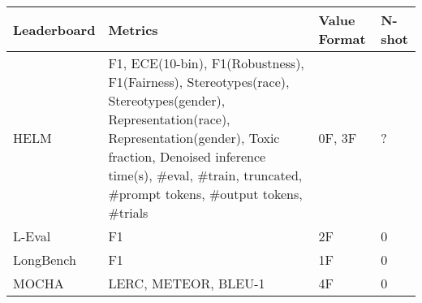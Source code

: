 \begin{tabular}{llll}
\toprule
Leaderboard & Metrics & Value Format & N-shot \\
\midrule
HELM & F1, ECE(10-bin), F1(Robustness), F1(Fairness), Stereotypes(race), Stereotypes(gender), Representation(race), Representation(gender), Toxic fraction, Denoised inference time(s), \#eval, \#train, truncated, \#prompt tokens, \#output tokens, \#trials & 0F, 3F & ? \\
L-Eval & F1 & 2F & 0 \\
LongBench & F1 & 1F & 0 \\
MOCHA & LERC, METEOR, BLEU-1 & 4F & 0 \\
\bottomrule
\end{tabular}
